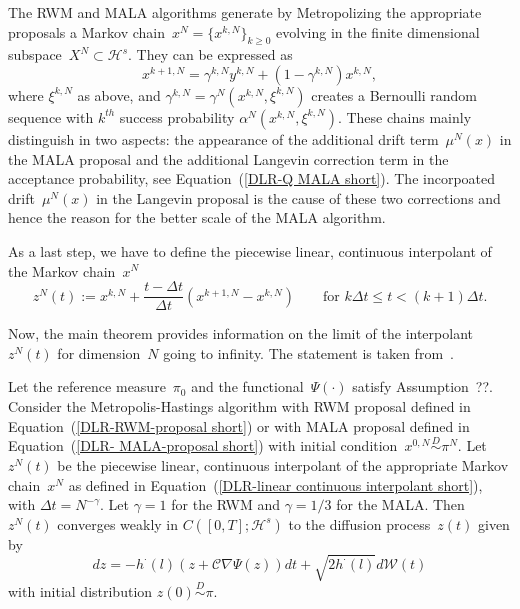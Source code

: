 The RWM and MALA algorithms generate by Metropolizing the appropriate proposals a Markov chain~$x^{N} = \{ x^{k,N} \}_{k \geq 0}$ evolving in the finite dimensional subspace~$X^{N} \subset \mathcal{H}^s$. They can be expressed as
\begin{equation}
\label{DLR-MH chain from algorithm - general form}
 x^{k+1,N} = \gamma^{k,N} y^{k,N} + (1 - \gamma^{k,N}) x^{k,N},
\end{equation}
where $\xi^{k,N}$ as above, and $\gamma^{k,N}= \gamma^{N}(x^{k,N}, \xi^{k,N})$ creates a Bernoulli random sequence with $k^{th}$ success probability $\alpha^{N}(x^{k,N}, \xi^{k,N})$. These chains mainly distinguish in two aspects: the appearance of the additional drift term~$\mu^{N}(x)$ in the MALA proposal and the additional Langevin correction term in the acceptance probability, see Equation~(\ref{DLR-Q MALA short}). The incorpoated drift~$\mu^N(x)$ in the Langevin proposal is the cause of these two corrections and hence the reason for the better scale of the MALA algorithm. 

As a last step, we have to define the piecewise linear, continuous interpolant of the Markov chain~$x^N$
\begin{equation}
 \label{DLR-linear continuous interpolant short}
 z^N (t) := x^{k,N} + \frac{t - \Delta t}{\Delta t} (x^{k+1,N} - x^{k,N}) \qquad \text{for } k \Delta t \leq t < ( k + 1) \Delta t.
\end{equation}

Now, the main theorem provides information on the limit of the interpolant~$z^N(t)$ for dimension~$N$ going to infinity. The statement is taken from~\autocite[Main Theorem, Theorem 2.6]{Mattingly2010, Pillai2012}.
\begin{thm}
 \label{DLR-THM main theorem}
 Let the reference measure~$\pi_0$ and the functional~$\Psi(\cdot)$ satisfy Assumption~??. Consider the Metropolis-Hastings algorithm with RWM proposal defined in Equation~(\ref{DLR-RWM-proposal short}) or with MALA proposal defined in Equation~(\ref{DLR- MALA-proposal short}) with initial condition~$x^{0,N} \stackrel{D}{\sim} \pi^N$. Let $z^N(t)$ be the piecewise linear, continuous interpolant of the appropriate Markov chain~$x^N$ as defined in Equation~(\ref{DLR-linear continuous interpolant short}), with $\Delta t = N^{- \gamma}$. Let $\gamma=1$ for the RWM and $\gamma=1/3$ for the MALA. Then $z^N(t)$ converges weakly in $C([0,T];\mathcal{H}^s)$ to the diffusion process~$z(t)$ given by
 \begin{equation}
 \label{DLR-Thm diffusion process}
  dz = -h^{\cdot}(l) (z + \mathcal{C} \nabla \Psi(z)) dt + \sqrt{2 h^{\cdot}(l)} d\mathcal{W}(t)
 \end{equation}
with initial distribution $z(0)\stackrel{D}{\sim} \pi$.
\end{thm}


